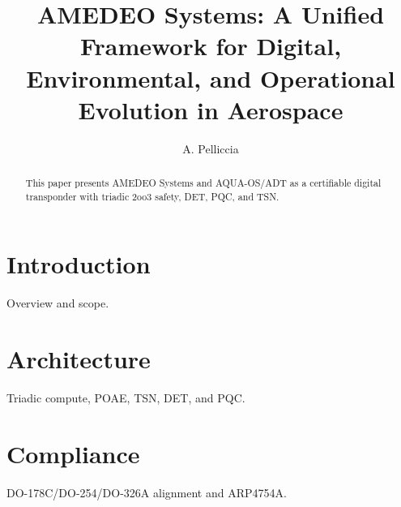 \documentclass[preprint]{elsarticle}
\begin{document}
\title{AMEDEO Systems: A Unified Framework for Digital, Environmental, and Operational Evolution in Aerospace}
\author{A. Pelliccia}
\begin{abstract}
This paper presents AMEDEO Systems and AQUA-OS/ADT as a certifiable digital transponder with triadic 2oo3 safety, DET, PQC, and TSN.
\end{abstract}
\maketitle
\section{Introduction}
Overview and scope.
\section{Architecture}
Triadic compute, POAE, TSN, DET, and PQC.
\section{Compliance}
DO-178C/DO-254/DO-326A alignment and ARP4754A.


\end{document}
